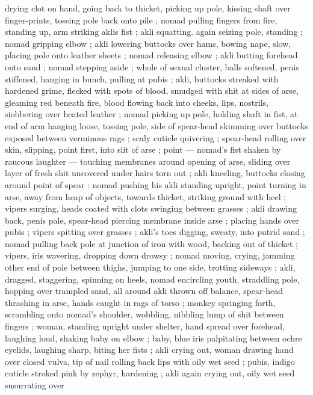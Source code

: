 {drying clot on hand, going back to thicket, picking up pole, kissing 
shaft over finger-prints, tossing pole back onto pile ; nomad pulling 
fingers from fire, standing up, arm striking aklis fist ; akli squatting. 
again seizing pole, standing ; nomad gripping elbow ; akli lowering 
buttocks over hams, bowing nape, slow, placing pole onto leather 
sheets ; nomad releasing elbow ; akli butting forehead onto sand ; 
nomad stepping aside ; whole of sexual cluster, balls softened, penis 
stiffened, hanging in bunch, pulling at pubis ; akli, buttocks streaked 
with hardened grime, flecked with spots of blood, smudged with shit 
at sides of arse, gleaming red beneath fire, blood flowing back into 
cheeks, lips, nostrils, siobbering over heated leather ; nomad picking 
up pole, holding shaft in fist, at end of arm hanging loose, tossing 
pole, side of spear-head skimming over buttocks exposed between 
verminous rags ; scaly cuticle quivering ; spear-head rolling over 
skin, slipping, point first, into slit of arse ; point --- nomad's fist 
shaken by raucous laughter --- touching membranes around opening 
of arse, sliding over layer of fresh shit uncovered under hairs torn 
out ; akli kneeling, buttocks closing around point of spear : nomad 
pushing his akli standing upright, point turning in arse, away from 
heap of objects, towards thicket, striking ground with heel ; vipers 
surging, heads coated with clots swinging between grasses ; akli 
drawing back, penis pale, spear-head piercing membrane inside arse 
; placing hands over pubis ; vipers spitting over grasses ; akli's toes 
digging, sweaty, into putrid sand ; nomad pulling back pole at 
junction of iron with wood, backing out of thicket ; vipers, iris 
wavering, dropping down drowsy ; nomad moving, crying, jamming 
other end of pole between thighs, jumping to one side, trotting 
sideways ; akli, dragged, staggering, spinning on heels, nomad 
encircling youth, straddling pole, hopping over trampled sand, all 
around akli thrown off balance, spear-head thrashing in arse, hands 
caught in rags of torso ; monkey springing forth, scrambling onto 
nomad's shoulder, wobbling, nibbling lump of shit between fingers ; 
woman, standing upright under shelter, hand spread over forehead, 
laughing loud, shaking baby on elbow ; baby, blue iris palpitating 
between ochre eyelids, laughing sharp, biting her fists ; akli crying 
out, woman drawing hand over closed vulva, tip of nail rolling back 
lips with oily wet seed ; pubis, indigo cuticle stroked pink by zephyr, 
hardening ; akli again crying out, oily wet seed susurrating over 
}
